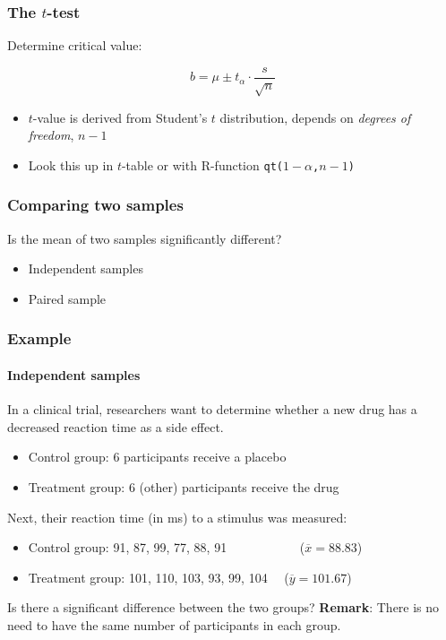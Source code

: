 \documentclass{beamer}
\begin{document}
\begin{frame}
  \frametitle{The $t$-test}
  
  Determine critical value:
  
  \[ b = \mu \pm t_\alpha \cdot \frac{s}{\sqrt{n}} \]
  
  \begin{itemize}
    \item $t$-value is derived from Student's $t$ distribution, depends on \emph{degrees of freedom}, $n-1$
    \item Look this up in $t$-table or with R-function \texttt{qt($1-\alpha$,$n-1$)}
  \end{itemize}
  
\end{frame}

\begin{frame}
  \frametitle{Comparing two samples}
  
  Is the mean of two samples significantly different?
  
  \begin{itemize}
    \item Independent samples
    \item Paired sample
  \end{itemize}
\end{frame}

\begin{frame}
  \frametitle{Example}
  \framesubtitle{Independent samples}
  
  In a clinical trial, researchers want to determine whether a new drug has a decreased reaction time as a side effect.
  
  \begin{itemize}
    \item Control group: 6 participants receive a placebo
    \item Treatment group: 6 (other) participants receive the drug
  \end{itemize}
  
  Next, their reaction time (in ms) to a stimulus was measured:
  
  \begin{itemize}
    \item Control group: 91, 87, 99, 77, 88, 91 ~~~~~~~~~~~($\overline{x}=88.83$)
    \item Treatment group: 101, 110, 103, 93, 99, 104 ~~($\overline{y}=101.67$)
  \end{itemize}
  
  Is there a significant difference between the two groups?
\vfill
  \textbf{Remark}: There is no need to have the same number of participants in each group.
\end{frame}
\end{document}
